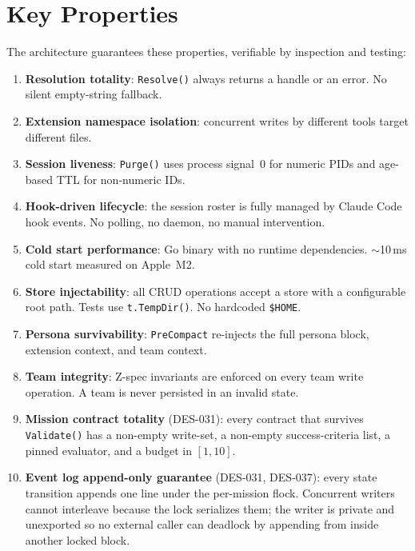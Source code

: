\documentclass[a4paper,10pt]{article}
\begin{document}
\section{Key Properties}

The architecture guarantees these properties, verifiable by
inspection and testing:

\begin{enumerate}
  \item \textbf{Resolution totality}: \texttt{Resolve()} always
    returns a handle or an error.  No silent empty-string fallback.

  \item \textbf{Extension namespace isolation}: concurrent writes by
    different tools target different files.

  \item \textbf{Session liveness}: \texttt{Purge()} uses process
    signal~0 for numeric PIDs and age-based TTL for non-numeric IDs.

  \item \textbf{Hook-driven lifecycle}: the session roster is fully
    managed by Claude Code hook events.  No polling, no daemon, no
    manual intervention.

  \item \textbf{Cold start performance}: Go binary with no runtime
    dependencies.  $\sim$10\,ms cold start measured on Apple~M2.

  \item \textbf{Store injectability}: all CRUD operations accept a
    store with a configurable root path.  Tests use
    \texttt{t.TempDir()}.  No hardcoded \texttt{\$HOME}.

  \item \textbf{Persona survivability}: \texttt{PreCompact} re-injects
    the full persona block, extension context, and team context.

  \item \textbf{Team integrity}: Z-spec invariants are enforced on
    every team write operation.  A team is never persisted in an
    invalid state.

  \item \textbf{Mission contract totality} (DES-031): every contract
    that survives \texttt{Validate()} has a non-empty write-set, a
    non-empty success-criteria list, a pinned evaluator, and a
    budget in $[1, 10]$.

  \item \textbf{Event log append-only guarantee} (DES-031, DES-037):
    every state transition appends one line under the per-mission
    flock.  Concurrent writers cannot interleave because the lock
    serializes them; the writer is private and unexported so no
    external caller can deadlock by appending from inside another
    locked block.


\end{enumerate}
\end{document}
